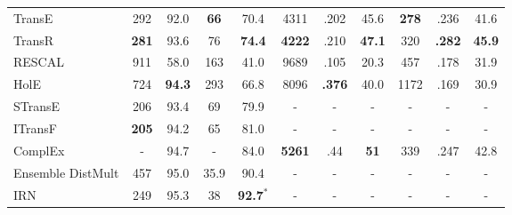 \documentclass[11pt,a4paper]{article}
\begin{document}
\begin{table*}[!t]
\begin{tabular}{@{}lcccccccccc@{}}
\midrule
TransE \citep{DBLP:conf/nips/BordesUGWY13} & 292 & 92.0 & \textbf{66} & 70.4 & 4311 & .202 & 45.6 & \textbf{278} & .236 & 41.6 \\
TransR \citep{DBLP:conf/aaai/LinLSLZ15} & \textbf{281} & 93.6 & 76 & \textbf{74.4} & \textbf{4222} & .210 & \textbf{47.1} & 320 & \textbf{.282} & \textbf{45.9} \\
RESCAL \citep{Nickel:2011:TMC:3104482.3104584} & 911 & 58.0 & 163 & 41.0 & 9689 & .105 & 20.3 & 457 & .178 & 31.9 \\
HolE \citep{DBLP:conf/aaai/NickelRP16} & 724 & \textbf{94.3} & 293 & 66.8 & 8096 & \textbf{.376} & 40.0 & 1172 & .169 & 30.9 \\
\midrule
STransE \citep{nguyen-EtAl:2016:N16-1} & 206 & 93.4 & 69 & 79.9 & - & - & - & - & - & - \\
ITransF \citep{xie-EtAl:2017:Long} & \textbf{205} & 94.2 & 65 & 81.0 & - & - & - & - & - & - \\
ComplEx \citep{DBLP:conf/icml/TrouillonWRGB16} & - & 94.7 & - & 84.0 & \textbf{5261} & .44 & \textbf{51} & 339 & .247 & 42.8 \\
Ensemble DistMult \citep{kadlec-bajgar-kleindienst:2017:RepL4NLP} & 457 & 95.0 & 35.9 & 90.4 & - & - & - & - & - & - \\
IRN \citep{shen-EtAl:2017:RepL4NLP1} & 249 & 95.3 & 38 & \textbf{92.7$^*$} & - & - & - & - & - & - \\

\end{tabular}
\end{table*}
\end{document}
